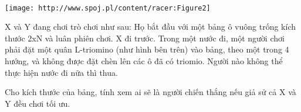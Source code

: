  


\texttt{[image: http://www.spoj.pl/content/racer:Figure2]}

X và Y đang chơi trò chơi như sau: Họ bắt đầu với một bảng ô vuông trống kích thước 2xN và luân phiên chơi. X đi trước. Trong một nước đi, một người chơi phải đặt một quân L-triomino (như hình bên trên) vào bảng, theo một trong 4 hướng, và không được đặt chèn lên các ô đã có triomio. Người nào không thể thực hiện nước đi nữa thì thua.

Cho kích thước của bảng, tính xem ai sẽ là người chiến thắng nếu giả sử cả X và Y đều chơi tối ưu.

\